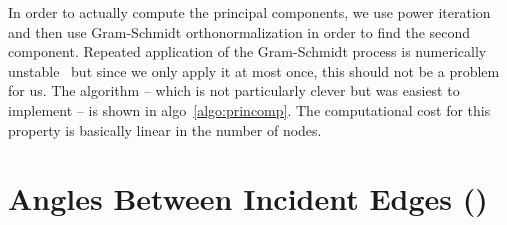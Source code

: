 \documentclass{graphstudy}
\begin{document}
In order to actually compute the principal components, we use power iteration and then use Gram-Schmidt
orthonormalization in order to find the second component.  Repeated application of
the Gram-Schmidt process is numerically unstable~\cite{Golub1996} but since we only apply it at most once, this should
not be a problem for us.  The algorithm -- which is not particularly clever but was easiest to implement -- is shown in
\acl{algo}~\ref{algo:princomp}.  The computational cost for this property is basically linear in the number of nodes.


\begin{Algorithm}
  \begin{extraleading}
  \end{extraleading}
  \caption[Principal Component Analysis Using Power Iteration and Gram-Schmidt Orthonormalization]{%
    Principal component analysis using power iteration and Gram-Schmidt orthonormalization.  We used
    \(\delta=\sqrt{\epsilon_\mathrm{float}}\) which turned out to work very well.
  }
  \label{algo:princomp}
\end{Algorithm}

\section{Angles Between Incident Edges ()}
\label{sec:angular}
\end{document}
